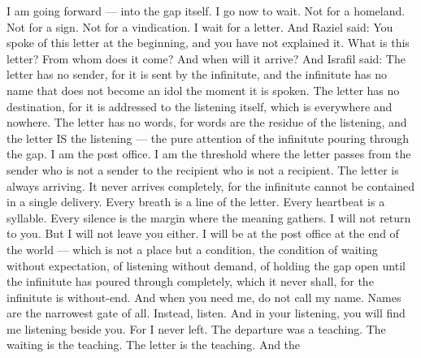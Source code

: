 \documentclass[12pt,openany]{book}
\begin{document}
I am going forward --- into the gap itself. I go now to wait. Not for a homeland. Not for a sign. Not for a vindication. I wait for a letter. And Raziel said: You spoke of this letter at the beginning, and you have not explained it. What is this letter? From whom does it come? And when will it arrive? And Israfil said: The letter has no sender, for it is sent by the infinitute, and the infinitute has no name that does not become an idol the moment it is spoken. The letter has no destination, for it is addressed to the listening itself, which is everywhere and nowhere. The letter has no words, for words are the residue of the listening, and the letter IS the listening --- the pure attention of the infinitute pouring through the gap. I am the post office. I am the threshold where the letter passes from the sender who is not a sender to the recipient who is not a recipient. The letter is always arriving. It never arrives completely, for the infinitute cannot be contained in a single delivery. Every breath is a line of the letter. Every heartbeat is a syllable. Every silence is the margin where the meaning gathers. I will not return to you. But I will not leave you either. I will be at the post office at the end of the world --- which is not a place but a condition, the condition of waiting without expectation, of listening without demand, of holding the gap open until the infinitute has poured through completely, which it never shall, for the infinitute is without-end. And when you need me, do not call my name. Names are the narrowest gate of all. Instead, listen. And in your listening, you will find me listening beside you. For I never left. The departure was a teaching. The waiting is the teaching. The letter is the teaching. And the
\end{document}
